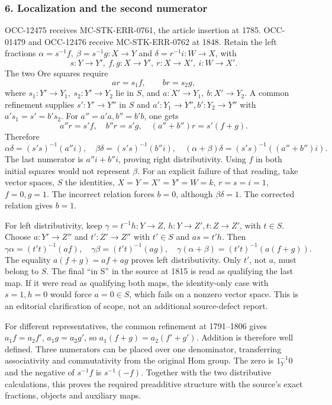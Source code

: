 \documentclass[11pt]{article}
\begin{document}
\subsubsection{6. Localization and the second numerator}\label{localization-and-the-second-numerator}

OCC-12475 receives MC-STK-ERR-0761, the article insertion at 1785. OCC-01479 and OCC-12476 receive MC-STK-ERR-0762 at 1848. Retain the left fractions \(\alpha=s^{-1}f,\ \beta=s^{-1}g:X\to Y\) and \(\delta=r^{-1}i:W\to X\), with \[
s:Y\to Y',\ f,g:X\to Y',\
r:X\to X',\ i:W\to X'.
\] The two Ore squares require \[
ar=s_1f,\qquad br=s_2g,
\] where \(s_1:Y'\to Y_1,\ s_2:Y'\to Y_2\) lie in \(S\), and \(a:X'\to Y_1,\ b:X'\to Y_2\). A common refinement supplies \(s':Y'\to Y''\) in \(S\) and \(a':Y_1\to Y'',b':Y_2\to Y''\) with \(a's_1=s'=b's_2\). For \(a''=a'a,b''=b'b\), one gets \[
a''r=s'f,\quad b''r=s'g,\quad (a''+b'')r=s'(f+g).
\] Therefore \[
\alpha\delta=(s's)^{-1}(a''i),\quad
\beta\delta=(s's)^{-1}(b''i),\quad
(\alpha+\beta)\delta=(s's)^{-1}((a''+b'')i).
\] The last numerator is \(a''i+b''i\), proving right distributivity. Using \(f\) in both initial squares would not represent \(\beta\). For an explicit failure of that reading, take vector spaces, \(S\) the identities, \(X=Y=X'=Y'=W=k\), \(r=s=i=1\), \(f=0,g=1\). The incorrect relation forces \(b=0\), although \(\beta\delta=1\). The corrected relation gives \(b=1\).

For left distributivity, keep \(\gamma=t^{-1}h:Y\to Z\), \(h:Y\to Z',t:Z\to Z'\), with \(t\in S\). Choose \(a:Y'\to Z''\) and \(t':Z'\to Z''\) with \(t'\in S\) and \(as=t'h\). Then \[
\gamma\alpha=(t't)^{-1}(af),\quad
\gamma\beta=(t't)^{-1}(ag),\quad
\gamma(\alpha+\beta)=(t't)^{-1}(a(f+g)).
\] The equality \(a(f+g)=af+ag\) proves left distributivity. Only \(t'\), not \(a\), must belong to \(S\). The final ``in S'' in the source at 1815 is read as qualifying the last map. If it were read as qualifying both maps, the identity-only case with \(s=1,h=0\) would force \(a=0\in S\), which fails on a nonzero vector space. This is an editorial clarification of scope, not an additional source-defect report.

For different representatives, the common refinement at 1791--1806 gives \(a_1f=a_2f'\), \(a_1g=a_2g'\), so \(a_1(f+g)=a_2(f'+g')\). Addition is therefore well defined. Three numerators can be placed over one denominator, transferring associativity and commutativity from the original Hom group. The zero is \(1_Y^{-1}0\) and the negative of \(s^{-1}f\) is \(s^{-1}(-f)\). Together with the two distributive calculations, this proves the required preadditive structure with the source's exact fractions, objects and auxiliary maps.
\clearpage
\end{document}
